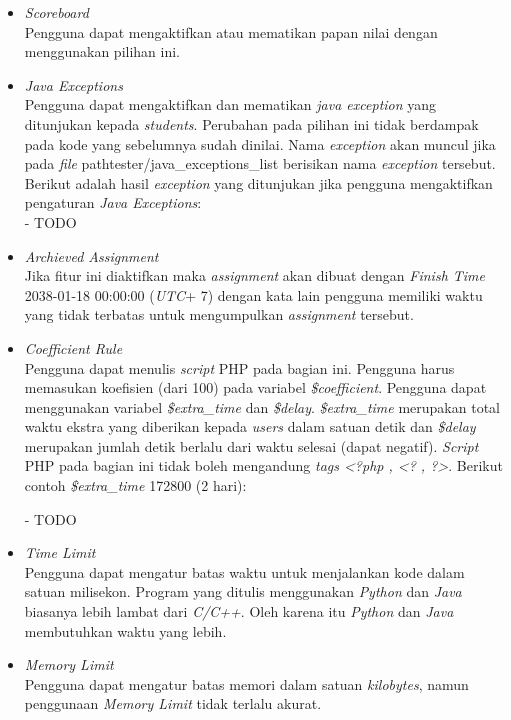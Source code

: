 \begin{itemize}
	\item \textit{Scoreboard} \\
	Pengguna dapat mengaktifkan atau mematikan papan nilai dengan menggunakan pilihan ini.
	
	\item \textit{Java Exceptions} \\
	Pengguna dapat mengaktifkan dan mematikan \textit{java exception} yang ditunjukan kepada \textit{students}. Perubahan pada pilihan ini tidak berdampak pada kode yang sebelumnya sudah dinilai. Nama \textit{exception} akan muncul jika pada \textit{file} path{tester/java\_exceptions\_list} berisikan nama \textit{exception} tersebut. Berikut adalah hasil \textit{exception} yang ditunjukan jika pengguna mengaktifkan pengaturan \textit{Java Exceptions}: \\
	
	- TODO
	
	\item \textit{Archieved Assignment} \\
	Jika fitur ini diaktifkan maka \textit{assignment} akan dibuat dengan \textit{Finish Time} 2038-01-18 00:00:00 (\textit{UTC}+ 7) dengan kata lain pengguna memiliki waktu yang tidak terbatas untuk mengumpulkan \textit{assignment} tersebut.
	
	\item \textit{Coefficient Rule} \\
	Pengguna dapat menulis \textit{script} PHP pada bagian ini. Pengguna harus memasukan koefisien (dari 100) pada variabel \textit{\$coefficient}. Pengguna dapat menggunakan variabel \textit{\$extra\_time} dan \textit{\$delay}. \textit{\$extra\_time} merupakan total waktu ekstra yang diberikan kepada \textit{users} dalam satuan detik dan \textit{\$delay} merupakan jumlah detik berlalu dari waktu selesai (dapat negatif). \textit{Script} PHP pada bagian ini tidak boleh mengandung \textit{tags <?php , <? , ?>}. Berikut contoh \textit{\$extra\_time} 172800 (2 hari):
	
	- TODO
	
	\item \textit{Time Limit} \\
	Pengguna dapat mengatur batas waktu untuk menjalankan kode dalam satuan milisekon. Program yang ditulis menggunakan \textit{Python} dan \textit{Java} biasanya lebih lambat dari \textit{C/C++}. Oleh karena itu \textit{Python} dan \textit{Java} membutuhkan waktu yang lebih.
	
	\item \textit{Memory Limit} \\
	Pengguna dapat mengatur batas memori dalam satuan \textit{kilobytes}, namun penggunaan \textit{Memory Limit} tidak terlalu akurat.
	

\end{itemize}
